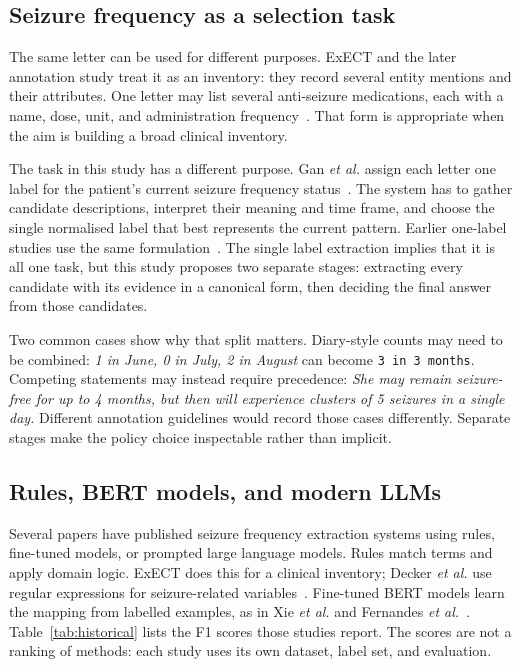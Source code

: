 \documentclass[conference]{IEEEtran}
\begin{document}
\subsection{Seizure frequency as a selection task}

The same letter can be used for different purposes. 
ExECT and the later annotation study treat it as 
an inventory: they record several entity mentions and 
their attributes. One letter may list several anti-seizure 
medications, each with a name, dose, unit, and 
administration frequency~\cite{b4,b3}. That form is 
appropriate when the aim is building a broad clinical
inventory.

The task in this study has a different purpose. Gan \emph{et al.} 
assign each letter one label for the patient's current 
seizure frequency status~\cite{b5}. The system has to gather 
candidate descriptions, interpret their meaning and 
time frame, and choose the single normalised label 
that best represents the current pattern. Earlier 
one-label studies use the same formulation~\cite{b6,b7,b8}. 
The single label extraction implies that it is all one 
task, but this study proposes two separate stages: 
extracting every candidate with its evidence in a 
canonical form, then deciding the final answer from 
those candidates.

Two common cases show why that split matters. 
Diary-style counts may need to be combined: \emph{1 in June, 
0 in July, 2 in August} can become \texttt{3 in 3 months}. 
Competing statements may instead require precedence: 
\emph{She may remain seizure-free for up to 4 months, but 
then will experience clusters of 5 seizures in a single day.} 
Different annotation guidelines would record those cases 
differently. Separate stages make the policy choice 
inspectable rather than implicit.

\subsection{Rules, BERT models, and modern LLMs}

Several papers have published seizure frequency 
extraction systems using rules, fine-tuned models, or 
prompted large language models. Rules match terms 
and apply domain logic. ExECT does this for a clinical 
inventory; Decker \emph{et al.} use regular expressions 
for seizure-related variables~\cite{b4,b9}. Fine-tuned 
BERT models learn the mapping from labelled examples, 
as in Xie \emph{et al.} and Fernandes \emph{et al.}~\cite{b6,b10}. 
Table~\ref{tab:historical} lists the F1 scores those studies 
report. The scores are not a ranking of methods: each 
study uses its own dataset, label set, and evaluation.
\end{document}
